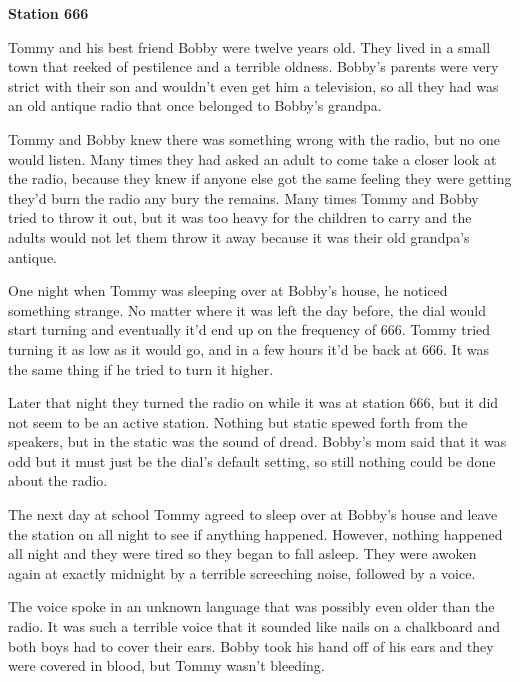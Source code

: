 

{\bf Station 666}



Tommy and his best friend Bobby were twelve years old. They lived
in a small town that reeked of pestilence and a terrible oldness.
Bobby's parents were very strict with their son and
wouldn't even get him a television, so all they had was an
old antique radio that once belonged to Bobby's
grandpa.



Tommy and Bobby knew there was something wrong with the radio, but
no one would listen. Many times they had asked an adult to come
take a closer look at the radio, because they knew if anyone else
got the same feeling they were getting they'd burn the radio
any bury the remains. Many times Tommy and Bobby tried to throw it
out, but it was too heavy for the children to carry and the adults
would not let them throw it away because it was their old
grandpa's antique.



One night when Tommy was sleeping over at Bobby's house, he
noticed something strange. No matter where it was left the day
before, the dial would start turning and eventually it'd end
up on the frequency of 666. Tommy tried turning it as low as it
would go, and in a few hours it'd be back at 666. It was the
same thing if he tried to turn it higher.



Later that night they turned the radio on while it was at station
666, but it did not seem to be an active station. Nothing but
static spewed forth from the speakers, but in the static was the
sound of dread. Bobby's mom said that it was odd but it must
just be the dial's default setting, so still nothing could be
done about the radio.



The next day at school Tommy agreed to sleep over at Bobby's
house and leave the station on all night to see if anything
happened. However, nothing happened all night and they were tired
so they began to fall asleep. They were awoken again at exactly
midnight by a terrible screeching noise, followed by a voice.



The voice spoke in an unknown language that was possibly even older
than the radio. It was such a terrible voice that it sounded like
nails on a chalkboard and both boys had to cover their ears. Bobby
took his hand off of his ears and they were covered in blood, but
Tommy wasn't bleeding.



